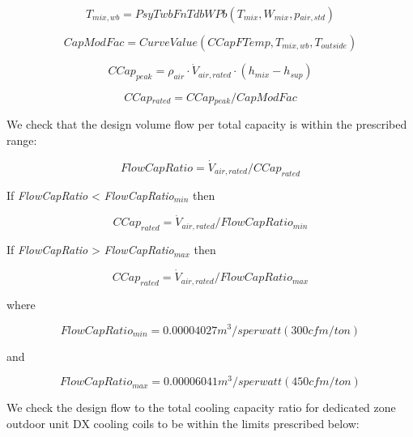\begin{equation}
\textit{T\(_{mix,wb}\)} = \textit{PsyTwbFnTdbWPb}(\textit{T\(_{mix}\)},\textit{W\(_{mix}\)}, \textit{p\(_{air,std}\)})
\end{equation}

\begin{equation}
\textit{CapModFac} = \textit{CurveValue}(CCapFTemp,\textit{T\(_{mix,wb}\)},\textit{T\(_{outside}\)})
\end{equation}

\begin{equation}
CCap_{peak} = \rho_{air} \cdot \dot V_{air,rated} \cdot (h_{mix} - h_{sup})
\end{equation}

\begin{equation}
\textit{CCap\(_{rated}\)} = \textit{CCap\(_{peak}\)}/ \textit{CapModFac}
\end{equation}

We check that the design volume flow per total capacity is within the prescribed range:

\begin{equation}
FlowCapRatio = \dot V_{air,rated} /CCap_{rated}
\end{equation}

If \emph{FlowCapRatio} \textless{} \emph{FlowCapRatio\(_{min}\)} then

\begin{equation}
CCap_{rated} = \dot V_{air,rated}/FlowCapRatio_{min}
\end{equation}

If \emph{FlowCapRatio} \textgreater{} \emph{FlowCapRatio\(_{max}\)} then

\begin{equation}
CCap_{rated} = \dot V_{air,rated} /FlowCapRatio_{max}
\end{equation}

where

\begin{equation}
\textit{FlowCapRatio\(_{min}\)} = 0.00004027 m^{3}/s per watt (300 cfm/ton)
\end{equation}

and

\begin{equation}
\textit{FlowCapRatio\(_{max}\)} = 0.00006041 m^{3}/s per watt (450 cfm/ton)
\end{equation}

We check the design flow to the total cooling capacity ratio for dedicated zone outdoor unit DX cooling coils to be within the limits prescribed below:

